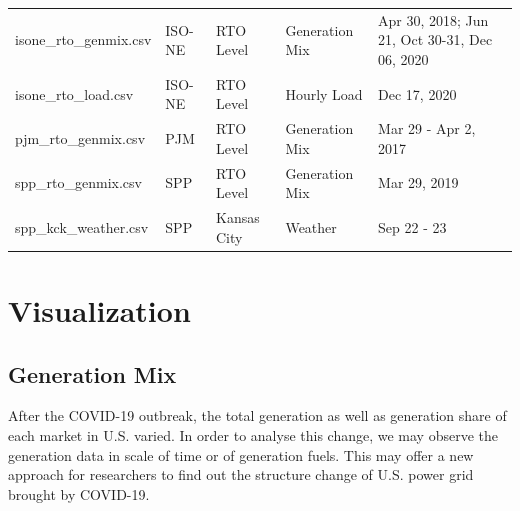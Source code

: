 \documentclass[10pt]{article}
\numberwithin{equation}{section}
\numberwithin{table}{section}
\numberwithin{figure}{section}
\begin{document}
\begin{table}[htbp]
\begin{tabular}{llllp{}}
	isone\_rto\_genmix.csv                    & ISO-NE                              & RTO Level                         & Generation Mix                        & Apr 30, 2018; Jun 21, Oct 30-31, Dec 06, 2020                                                                                \\
	isone\_rto\_load.csv                      & ISO-NE                              & RTO Level                         & Hourly Load                           & Dec 17, 2020                                                                                                                 \\
	pjm\_rto\_genmix.csv                      & PJM                                 & RTO Level                         & Generation Mix                        & Mar 29 - Apr 2, 2017                                                                                                         \\
	spp\_rto\_genmix.csv                      & SPP                                 & RTO Level                         & Generation Mix                        & Mar 29, 2019                                                                                                                 \\
	spp\_kck\_weather.csv                     & SPP                                 & Kansas City                       & Weather                               & Sep 22 - 23                \\                                                                                                 
	\bottomrule
	\end{tabular}
	\end{table}









\newpage
\section{Visualization} \label{sec:visual}

\subsection{Generation Mix}

After the COVID-19 outbreak, the total generation as well as generation share of each market in U.S. varied. In order to analyse this change, we may observe the generation data in scale of time or of generation fuels. This may offer a new approach for researchers to find out the structure change of U.S. power grid brought by COVID-19.
\end{document}
